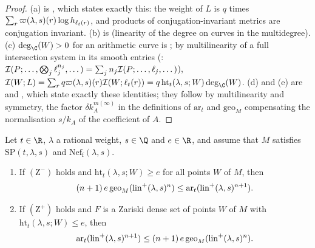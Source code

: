 \begin{proof}
(a) is , which states exactly this: the weight of
$L$ is $q$ times $\sum_r\varpi(\lambda,s)(r)\log h_{\ell_t(r)}$, and products of conjugation-invariant
metrics are conjugation invariant. (b) is 
(linearity of the degree on curves in the multidegree). (c) $\deg_\C(W)>0$ for an arithmetic curve is
; by multilinearity of a
full intersection system in its smooth entries
(: $\mathcal{I}(P;\dots,\bigotimes_j\ell_j^{n_j},
\dots)=\sum_jn_j\mathcal{I}(P;\dots,\ell_j,\dots)$),
$\volthmII(W;L)=\sum_rq\volthmcoef(\lambda,s)(r)\volthmII(W;\ell_t(r))=q\,\mathrm{ht}_t(\lambda,s;W)\deg_\C(W)$.
(d) and (e) are  and
, which state exactly these identities; they
follow by multilinearity and symmetry, the factor $\delta k_A^{m(\infty)}$ in the definitions of
$\mathrm{ar}_t$ and $\mathrm{geo}_M$ compensating the normalisation $s/k_A$ of the coefficient of $A$.
\end{proof}

\begin{proposition}\label{pf:volthm:prop:zhang}
Let $t\in\R$, $\lambda$ a rational weight, $s\in\Q$ and $e\in\R$, and assume that $M$ satisfies
$\mathrm{SP}(t,\lambda,s)$ and $\mathrm{Nef}_{\mathrm f}(\lambda,s)$.
\begin{enumerate}[label=(\alph*)]
\item If $(\mathrm{Z}^-)$ holds and $\mathrm{ht}_t(\lambda,s;W)\ge e$ for all points $W$ of $M$, then
  \[
  (n+1)\,e\,\mathrm{geo}_M(\mathrm{lin}^+(\lambda,s)^n)\le\mathrm{ar}_t(\mathrm{lin}^+(\lambda,s)^{n+1}).
  \]
\item If $(\mathrm{Z}^+)$ holds and $F$ is a Zariski dense set of points $W$ of $M$ with
  $\mathrm{ht}_t(\lambda,s;W)\le e$, then
  \[
  \mathrm{ar}_t(\mathrm{lin}^+(\lambda,s)^{n+1})\le(n+1)\,e\,\mathrm{geo}_M(\mathrm{lin}^+(\lambda,s)^n).
  \]
\end{enumerate}
\end{proposition}

